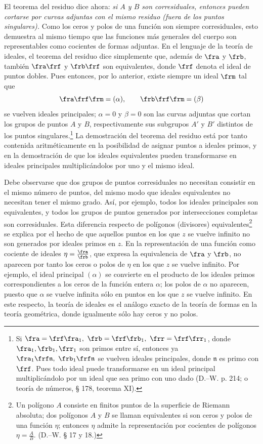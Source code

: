 \documentclass[11pt]{article}
\begin{document}
El teorema del residuo dice ahora: \emph{si \(A\) y \(B\) son corresiduales, entonces pueden cortarse por curvas adjuntas con el mismo residuo (fuera de los puntos singulares).} Como los ceros y polos de una función son siempre corresiduales, esto demuestra al mismo tiempo que las funciones más generales del cuerpo son representables como cocientes de formas adjuntas. En el lenguaje de la teoría de ideales, el teorema del residuo dice simplemente que, además de \(\fra\) y \(\frb\), también \(\fra\frf\) y \(\frb\frf\) son equivalentes, donde \(\frf\) denota el ideal de puntos dobles. Pues entonces, por lo anterior, existe siempre un ideal \(\frm\) tal que
\[
\fra\frf\frm=(\alpha),\qquad \frb\frf\frm=(\beta)
\]
se vuelven ideales principales; \(\alpha=0\) y \(\beta=0\) son las curvas adjuntas que cortan los grupos de puntos \(A\) y \(B\), respectivamente sus subgrupos \(A'\) y \(B'\) distintos de los puntos singulares.\footnote{Si \(\fra=\frf\fra_1,\ \frb=\frf\frb_1,\ \frr=\frf\frr_1\), donde \(\fra_1,\frb_1,\frr_1\) son primos entre sí, entonces ya \(\fra_1\frf\mathfrak n,\ \frb_1\frf\mathfrak n\) se vuelven ideales principales, donde \(\mathfrak n\) es primo con \(\frf\). Pues todo ideal puede transformarse en un ideal principal multiplicándolo por un ideal que sea primo con uno dado (D.--W. p. 214; o teoría de números, § 178, teorema XI).} La demostración del teorema del residuo está por tanto contenida aritméticamente en la posibilidad de asignar puntos a ideales primos, y en la demostración de que los ideales equivalentes pueden transformarse en ideales principales multiplicándolos por uno y el mismo ideal.

Debe observarse que dos grupos de puntos corresiduales no necesitan consistir en el mismo número de puntos, del mismo modo que ideales equivalentes no necesitan tener el mismo grado. Así, por ejemplo, todos los ideales principales son equivalentes, y todos los grupos de puntos generados por intersecciones completas son corresiduales. Esta diferencia respecto de polígonos (divisores) equivalentes\footnote{Un polígono \(A\) consiste en finitos puntos de la superficie de Riemann absoluta; dos polígonos \(A\) y \(B\) se llaman equivalentes si son ceros y polos de una función \(\eta\); entonces \(\eta\) admite la representación por cocientes de polígonos \(\eta=\frac{A}{B}\). (D.--W. § 17 y 18.)} se explica por el hecho de que aquellos puntos en los que \(z\) se vuelve infinito no son generados por ideales primos en \(z\). En la representación de una función como cociente de ideales \(\eta=\frac{\fra}{\frb}\), que expresa la equivalencia de \(\fra\) y \(\frb\), no aparecen por tanto los ceros o polos de \(\eta\) en los que \(z\) se vuelve infinito. Por ejemplo, el ideal principal \((\alpha)\) se convierte en el producto de los ideales primos correspondientes a los ceros de la función entera \(\alpha\); los polos de \(\alpha\) no aparecen, puesto que \(\alpha\) se vuelve infinita sólo en puntos en los que \(z\) se vuelve infinito. En este respecto, la teoría de ideales es el análogo exacto de la teoría de formas en la teoría geométrica, donde igualmente sólo hay ceros y no polos.
\end{document}

